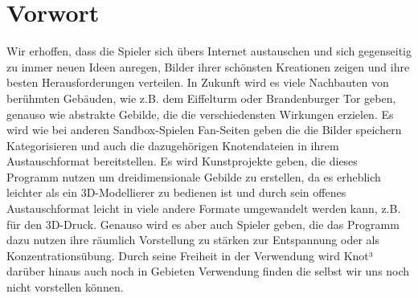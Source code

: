 
\chapter{Vorwort}
\label{EF:Vorstellungen}
Wir erhoffen, dass die Spieler sich übers Internet austauschen und sich gegenseitig zu immer neuen Ideen anregen, Bilder ihrer schönsten Kreationen zeigen und ihre besten Herausforderungen verteilen. In Zukunft wird es viele Nachbauten von berühmten Gebäuden, wie z.B. dem Eiffelturm oder Brandenburger Tor geben, genauso wie abstrakte Gebilde, die die verschiedensten Wirkungen erzielen. Es wird wie bei anderen Sandbox-Spielen Fan-Seiten geben die die Bilder speichern Kategorisieren und auch die dazugehörigen Knotendateien in ihrem Austauschformat bereitstellen. Es wird Kunstprojekte geben, die dieses Programm nutzen um dreidimensionale Gebilde zu erstellen, da es erheblich leichter als ein 3D-Modellierer zu bedienen ist und durch sein offenes Austauschformat leicht in viele andere Formate umgewandelt werden kann, z.B. für den 3D-Druck. Genauso wird es aber auch Spieler geben, die das Programm dazu nutzen ihre räumlich Vorstellung zu stärken zur Entspannung oder als Konzentrationsübung.
Durch seine Freiheit in der Verwendung wird Knot³ darüber hinaus auch noch in Gebieten Verwendung finden die selbst wir uns noch nicht vorstellen können.
